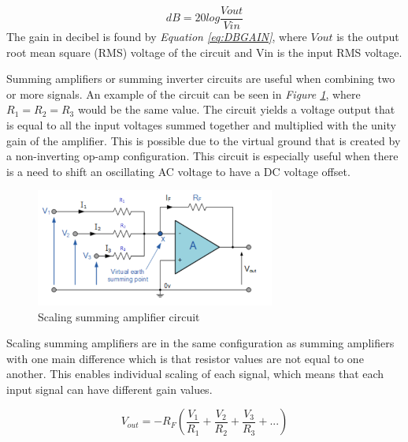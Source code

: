 \begin{equation}
    dB = 20log\frac{V{out}}{V{in}}
    \label{eq:DBGAIN}
\end{equation}
\vspace{1cm}
The gain in decibel is found by \textit{Equation \ref{eq:DBGAIN}}, where $V{out}$ is the output root mean square (RMS) voltage of the circuit and V{in} is the input RMS voltage.

Summing amplifiers or summing inverter circuits are useful when combining two or more signals.
An example of the circuit can be seen in \textit{Figure \ref{fig:SummingOpAmp}}, where $R_1 = R_2 = R_3$ would be the same value.
The circuit yields a voltage output that is equal to all the input voltages summed together and multiplied with the unity gain of the amplifier.
This is possible due to the virtual ground that is created by a non-inverting op-amp configuration\cite{noauthor_summing_2013}. 
This circuit is especially useful when there is a need to shift an oscillating AC voltage to have a DC voltage offset.


\begin{figure}[h]
    \centering
    \includegraphics[width=0.70\textwidth]{graphics/SummingOpAmp.png}
    \caption{Scaling summing amplifier circuit \cite{noauthor_summing_2013}}
    \label{fig:SummingOpAmp}
\end{figure}

Scaling summing amplifiers are in the same configuration as summing amplifiers with one main difference which is that resistor values are not equal to one another.
This enables individual scaling of each signal, which means that each input signal can have different gain values.


\begin{equation}
    V_{out} = -R_F(\frac{V_1}{R_{1}} +\frac{V_2}{R_{2}} +\frac{V_3}{R_{3}} + ...)
    \label{eq:ScalingGain}
\end{equation}

